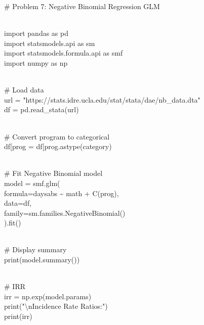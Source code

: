 \documentclass[
]{article}
\begin{document}
\# Problem 7: Negative Binomial Regression GLM\\
\strut \\
import pandas as pd\\
import statsmodels.api as sm\\
import statsmodels.formula.api as smf\\
import numpy as np\\
\strut \\
\# Load data\\
url = "https://stats.idre.ucla.edu/stat/stata/dae/nb\_data.dta"\\
df = pd.read\_stata(url)\\
\strut \\
\# Convert program to categorical\\
df{[}\textquotesingle prog\textquotesingle{]} =
df{[}\textquotesingle prog\textquotesingle{]}.astype(\textquotesingle category\textquotesingle)\\
\strut \\
\# Fit Negative Binomial model\\
model = smf.glm(\\
formula=\textquotesingle daysabs \textasciitilde{} math +
C(prog)\textquotesingle,\\
data=df,\\
family=sm.families.NegativeBinomial()\\
).fit()\\
\strut \\
\# Display summary\\
print(model.summary())\\
\strut \\
\# IRR\\
irr = np.exp(model.params)\\
print("\textbackslash nIncidence Rate Ratios:")\\
print(irr)

\subsection{}\label{section-2}

\subsection{}\label{section-3}

\subsection{}\label{section-4}
\end{document}
